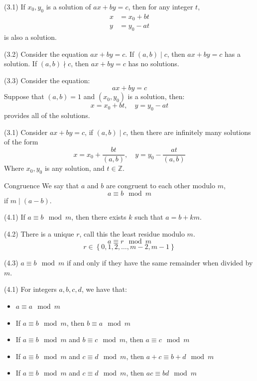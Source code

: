 \documentclass[12pt]{article}
\begin{document}
\begin{lemma}{(3.1)}{}
    If $ x_0, y_0 $ is a solution of $ ax + by = c $, then for any integer $ t $,
    \begin{align*}
        x & = x_0 + bt \\
        y & = y_0 - at
    \end{align*}
    is also a solution.
\end{lemma}
\begin{lemma}{(3.2)}{}
    Consider the equation $ ax + by = c $. If $ \left( a, b \right) \mid c $, then $ ax + by = c $ has a solution. If $ \left( a, b \right) \nmid c $, then $ ax + by = c $ has no solutions.
\end{lemma}
\begin{lemma}{(3.3)}{}
    Consider the equation:
    \[ ax + by = c \]
    Suppose that $ \left( a, b \right) = 1 $ and $ \left( x_0, y_0 \right) $ is a solution, then:
    \[ x = x_0 + bt, \quad y = y_0 - at \]
    provides all of the solutions.
\end{lemma}
\begin{theorem}{(3.1)}{}
    Consider $ ax + by = c $, if $ \left( a, b \right) \mid c $, then there are infinitely many solutions of the form
    \[ x = x_0 + \frac{bt}{\left( a, b \right)}, \quad y = y_0 - \frac{at}{\left( a, b \right)} \]
    Where $ x_0, y_0 $ is any solution, and $ t \in \mathbb{Z} $.
\end{theorem}
\begin{definition}{Congruence}{}
    We say that $ a $ and $ b $ are congruent to each other modulo $ m $,
    \[ a \equiv b \mod m \]
    if $ m \mid \left( a - b \right) $.
\end{definition}
\begin{theorem}{(4.1)}{}
    If $ a \equiv b \mod m $, then there exists $ k $ such that $ a = b + km $.
\end{theorem}
\begin{theorem}{(4.2)}{}
    There is a unique $ r $, call this the least residue modulo $ m $.
    \[ a \equiv r \mod m \]
    \[ r \in \left\{ 0, 1, 2, \dots, m - 2, m - 1 \right\} \]
\end{theorem}
\begin{theorem}{(4.3)}{}
    $ a \equiv b \mod m $ if and only if they have the same remainder when divided by $ m $.
\end{theorem}
\begin{lemma}{(4.1)}{}
    For integers $ a, b, c, d $, we have that:
    \begin{itemize}
        \item $ a \equiv a \mod m $
        \item If $ a \equiv b \mod m $, then $ b \equiv a \mod m $
        \item If $ a \equiv b \mod m $ and $ b \equiv c \mod m $, then $ a \equiv c \mod m $
        \item If $ a \equiv b \mod m $ and $ c \equiv d \mod m $, then $ a + c \equiv b + d \mod m $
        \item If $ a \equiv b \mod m $ and $ c \equiv d \mod m $, then $ ac \equiv bd \mod m $
    \end{itemize}
\end{lemma}
\end{document}

